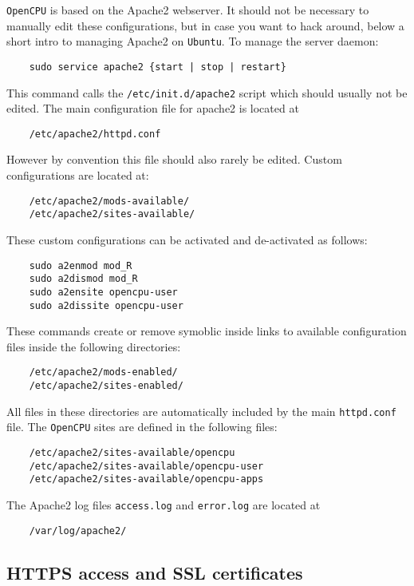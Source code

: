 \documentclass{scrartcl}
\begin{document}
\texttt{OpenCPU} is based on the Apache2 webserver. It should not be necessary to
manually edit these configurations, but in case you want to hack around,
below a short intro to managing Apache2 on \texttt{Ubuntu}. To manage the server daemon:

\begin{verbatim}
    sudo service apache2 {start | stop | restart}
\end{verbatim}
This command calls the \texttt{/etc/init.d/apache2} script which should usually
not be edited. The main configuration file for apache2 is located at

\begin{verbatim}
    /etc/apache2/httpd.conf
\end{verbatim}
However by convention this file should also rarely be edited. Custom
configurations are located at:

\begin{verbatim}
    /etc/apache2/mods-available/
    /etc/apache2/sites-available/
\end{verbatim}
These custom configurations can be activated and de-activated as follows:

\begin{verbatim}
    sudo a2enmod mod_R
    sudo a2dismod mod_R
    sudo a2ensite opencpu-user
    sudo a2dissite opencpu-user
\end{verbatim}
These commands create or remove symoblic inside links to available configuration
files inside the following directories:

\begin{verbatim}
    /etc/apache2/mods-enabled/
    /etc/apache2/sites-enabled/
\end{verbatim}
All files in these directories are automatically included by the main
\texttt{httpd.conf} file. The \texttt{OpenCPU} sites are defined in the
following files:

\begin{verbatim}
    /etc/apache2/sites-available/opencpu
    /etc/apache2/sites-available/opencpu-user
    /etc/apache2/sites-available/opencpu-apps
\end{verbatim}

The Apache2 log files \texttt{access.log} and \texttt{error.log} are located at
\begin{verbatim}
    /var/log/apache2/
\end{verbatim}

\subsection{HTTPS access and SSL certificates}
\end{document}
